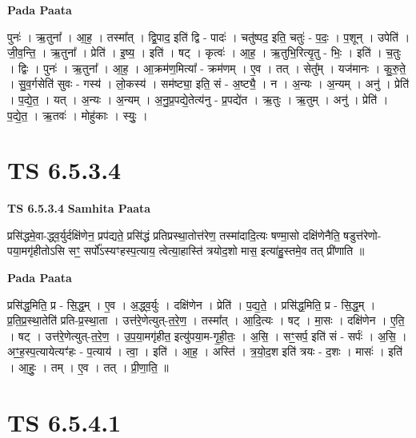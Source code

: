 \documentclass[17pt]{extarticle}
\begin{document}
\textbf{Pada Paata} \newline

पुनः॑ । ऋ॒तुना᳚ । आ॒ह॒ । तस्मा᳚त् । द्वि॒पाद॒ इति॑ द्वि - पादः॑ । चतु॑ष्पद॒ इति॒ चतुः॑ - प॒दः॒ । प॒शून् । उपेति॑ । जी॒व॒न्ति॒ । ऋ॒तुना᳚ । प्रेति॑ । इ॒ष्य॒ । इति॑ । षट् । कृत्वः॑ । आ॒ह॒ । ऋ॒तुभि॒रित्यृ॒तु - भिः॒ । इति॑ । च॒तुः । द्विः । पुनः॑ । ऋ॒तुना᳚ । आ॒ह॒ । आ॒क्रम॑ण॒मित्या᳚ - क्रम॑णम् । ए॒व । तत् । सेतु᳚म् । यज॑मानः । कु॒रु॒ते॒ । सु॒व॒र्गसेति॑ सुवः - गस्य॑ । लो॒कस्य॑ । सम॑ष्ट्या॒ इति॒ सं - अ॒ष्ट्यै॒ । न । अ॒न्यः । अ॒न्यम् । अनु॑ । प्रेति॑ । प॒द्ये॒त॒ । यत् । अ॒न्यः । अ॒न्यम् । अ॒नु॒प्र॒पद्ये॒तेत्य॑नु - प्र॒पद्ये॑त । ऋ॒तुः । ऋ॒तुम् । अनु॑ । प्रेति॑ । प॒द्ये॒त॒ । ऋ॒तवः॑ । मोहु॑काः । स्युः॒ ।  \newline




\section*{ TS 6.5.3.4 }

\textbf{TS 6.5.3.4 } \newline
\textbf{Samhita Paata} \newline

प्रसि॑द्धमे॒वा-द्ध्व॒र्युर्दक्षि॑णेन॒ प्रप॑द्यते॒ प्रसि॑द्धं प्रतिप्रस्था॒तोत्त॑रेण॒ तस्मा॑दादि॒त्यः षण्मा॒सो दक्षि॑णेनैति॒ षडुत्त॑रेणो-पया॒मगृ॑हीतोऽसि सꣳ॒॒ सर्पो᳚ऽस्यꣳहस्प॒त्याय॒ त्वेत्या॒हास्ति॑ त्रयोद॒शो मास॒ इत्या॑हु॒स्तमे॒व तत् प्री॑णाति ॥ \newline

\textbf{Pada Paata} \newline

प्रसि॑द्ध॒मिति॒ प्र - सि॒द्ध॒म् । ए॒व । अ॒द्ध्व॒र्युः । दक्षि॑णेन । प्रेति॑ । प॒द्य॒ते॒ । प्रसि॑द्ध॒मिति॒ प्र - सि॒द्ध॒म् । प्र॒ति॒प्र॒स्था॒तेति॑ प्रति-प्र॒स्था॒ता । उत्त॑रे॒णेत्युत्-त॒रे॒ण॒ । तस्मा᳚त् । आ॒दि॒त्यः । षट् । मा॒सः । दक्षि॑णेन । ए॒ति॒ । षट् । उत्त॑रे॒णेत्युत्-त॒रे॒ण॒ । उ॒प॒या॒मगृ॑हीत॒ इत्यु॑पया॒म-गृ॒ही॒तः॒ । अ॒सि॒ । सꣳ॒॒सर्प॒ इति॑ सं - सर्पः॑ । अ॒सि॒ । अꣳ॒॒ह॒स्प॒त्यायेत्यꣳ॑हः - प॒त्याय॑ । त्वा॒ । इति॑ । आ॒ह॒ । अस्ति॑ । त्र॒यो॒द॒श इति॑ त्रयः - द॒शः । मासः॑ । इति॑ । आ॒हुः॒ । तम् । ए॒व । तत् । प्री॒णा॒ति॒ ॥  \newline




\section*{ TS 6.5.4.1 }
\end{document}
